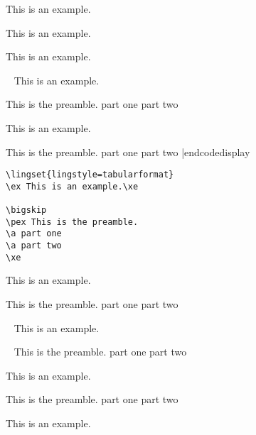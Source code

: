 \ex[exno=216] This is an example.

\xe

\bigskip

\ex This is an example.

\xe

\bigskip

\ex[exno=218] This is an example.

\xe

\bye

%
%
%
%
\bye
\codedisplay~
\ex This is an example.\xe

\pex This is the preamble.
\a part one
\a part two
\xe

\ex This is an example.\xe

\pex This is the preamble.
\a part one
\a part two
\xe
|endcodedisplay
\hfil
\bye
\begin{verbatim}\lingset{lingstyle=tabularformat}
\ex This is an example.\xe

\bigskip
\pex This is the preamble.
\a part one
\a part two
\xe\end{verbatim}


\ex This is an example.\xe

\bigskip
\pex This is the preamble.
\a part one
\a part two
\xe

\ex~ This is an example.\xe

\pex~ This is the preamble.
\a part one
\a part two
\xe
\resetexcnt
\hfil


\ex This is an example.\xe

\pex
This is the preamble.
\a part one
\a part two
\xe

\hfil


\ex This is an example.\xe

